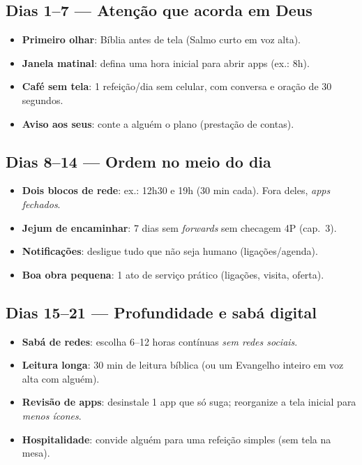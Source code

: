 \subsection*{Dias 1--7 — Atenção que acorda em Deus}
\begin{checklist}
\begin{itemize}[leftmargin=*,noitemsep]
  \item \textbf{Primeiro olhar}: Bíblia antes de tela (Salmo curto em voz alta).
  \item \textbf{Janela matinal}: defina uma hora inicial para abrir apps (ex.: 8h).
  \item \textbf{Café sem tela}: 1 refeição/dia sem celular, com conversa e oração de 30 segundos.
  \item \textbf{Aviso aos seus}: conte a alguém o plano (prestação de contas).
\end{itemize}
\end{checklist}

\subsection*{Dias 8--14 — Ordem no meio do dia}
\begin{checklist}
\begin{itemize}[leftmargin=*,noitemsep]
  \item \textbf{Dois blocos de rede}: ex.: 12h30 e 19h (30 min cada). Fora deles, \emph{apps fechados}.
  \item \textbf{Jejum de encaminhar}: 7 dias sem \emph{forwards} sem checagem 4P (cap.~3).
  \item \textbf{Notificações}: desligue tudo que não seja humano (ligações/agenda).
  \item \textbf{Boa obra pequena}: 1 ato de serviço prático (ligações, visita, oferta).
\end{itemize}
\end{checklist}

\subsection*{Dias 15--21 — Profundidade e sabá digital}
\begin{checklist}
\begin{itemize}[leftmargin=*,noitemsep]
  \item \textbf{Sabá de redes}: escolha 6--12 horas contínuas \emph{sem redes sociais}.
  \item \textbf{Leitura longa}: 30 min de leitura bíblica (ou um Evangelho inteiro em voz alta com alguém).
  \item \textbf{Revisão de apps}: desinstale 1 app que só suga; reorganize a tela inicial para \emph{menos ícones}.
  \item \textbf{Hospitalidade}: convide alguém para uma refeição simples (sem tela na mesa).
\end{itemize}
\end{checklist}

